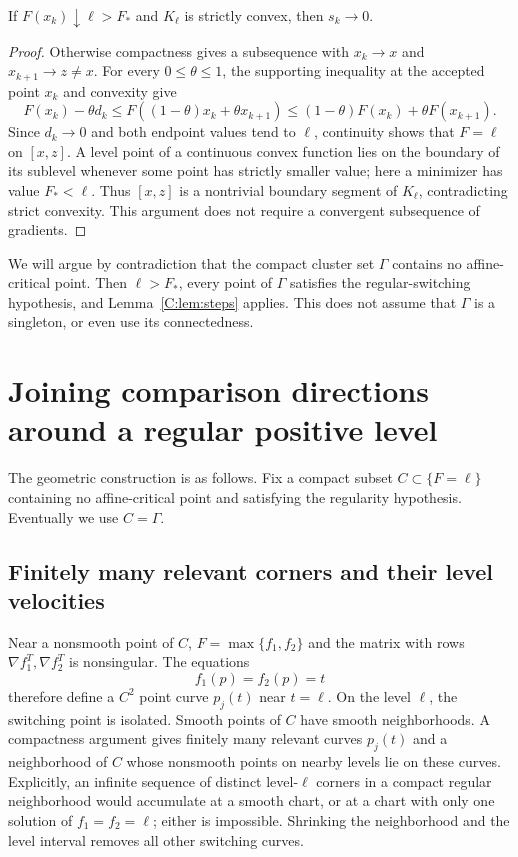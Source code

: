 \begin{lemma}\label{C:lem:steps}
If $F(x_k)\downarrow\ell>F_*$ and $K_\ell$ is strictly convex, then $s_k\to0$.
\end{lemma}
\begin{proof}
Otherwise compactness gives a subsequence with $x_k\to x$ and $x_{k+1}\to z\ne x$. For every $0\le\theta\le1$, the supporting inequality at the accepted point $x_k$ and convexity give
\[
 F(x_k)-\theta d_k
 \le F((1-\theta)x_k+\theta x_{k+1})
 \le(1-\theta)F(x_k)+\theta F(x_{k+1}).
\]
Since $d_k\to0$ and both endpoint values tend to $\ell$, continuity shows that $F=\ell$ on $[x,z]$. A level point of a continuous convex function lies on the boundary of its sublevel whenever some point has strictly smaller value; here a minimizer has value $F_*<\ell$. Thus $[x,z]$ is a nontrivial boundary segment of $K_\ell$, contradicting strict convexity. This argument does not require a convergent subsequence of gradients.
\end{proof}

We will argue by contradiction that the compact cluster set $\Gamma$ contains no affine-critical point. Then $\ell>F_*$, every point of $\Gamma$ satisfies the regular-switching hypothesis, and Lemma~\ref{C:lem:steps} applies. This does not assume that $\Gamma$ is a singleton, or even use its connectedness.


\setcounter{section}{3}
\setcounter{theorem}{4}
\setcounter{equation}{5}
\section{Joining comparison directions around a regular positive level}
The geometric construction is as follows. Fix a compact subset $C\subset\{F=\ell\}$ containing no affine-critical point and satisfying the regularity hypothesis. Eventually we use $C=\Gamma$.

\subsection{Finitely many relevant corners and their level velocities}
Near a nonsmooth point of $C$, $F=\max\{f_1,f_2\}$ and the matrix with rows $\nabla f_1^T,\nabla f_2^T$ is nonsingular. The equations
\[
 f_1(p)=f_2(p)=t
\]
therefore define a $C^2$ point curve $p_j(t)$ near $t=\ell$. On the level $\ell$, the switching point is isolated. Smooth points of $C$ have smooth neighborhoods. A compactness argument gives finitely many relevant curves $p_j(t)$ and a neighborhood of $C$ whose nonsmooth points on nearby levels lie on these curves. Explicitly, an infinite sequence of distinct level-$\ell$ corners in a compact regular neighborhood would accumulate at a smooth chart, or at a chart with only one solution of $f_1=f_2=\ell$; either is impossible. Shrinking the neighborhood and the level interval removes all other switching curves.

